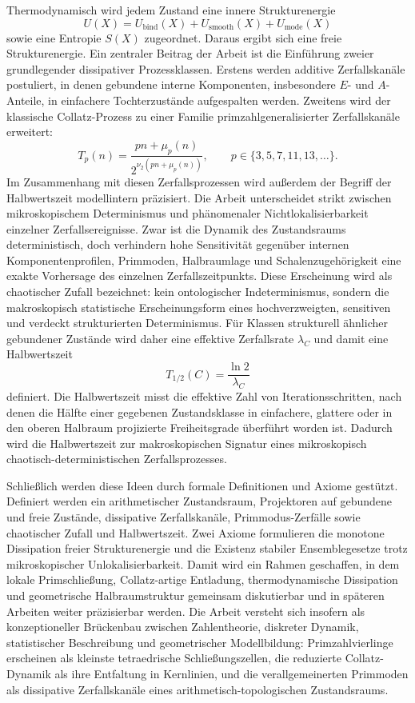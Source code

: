 \documentclass[11pt,a4paper]{article}
\theoremstyle{definition}
\begin{document}
	Thermodynamisch wird jedem Zustand eine innere Strukturenergie
	\[
	U(X)=U_{\mathrm{bind}}(X)+U_{\mathrm{smooth}}(X)+U_{\mathrm{mode}}(X)
	\]
	sowie eine Entropie \(S(X)\) zugeordnet. Daraus ergibt sich eine freie Strukturenergie. 	Ein zentraler Beitrag der Arbeit ist die Einführung zweier grundlegender dissipativer Prozessklassen. Erstens werden additive Zerfallskanäle postuliert, in denen gebundene interne Komponenten, insbesondere \(E\)- und \(A\)-Anteile, in einfachere Tochterzustände aufgespalten werden. Zweitens wird der klassische Collatz-Prozess zu einer Familie primzahlgeneralisierter Zerfallskanäle erweitert:
	\[
	T_p(n)=\frac{pn+\mu_p(n)}{2^{\nu_2(pn+\mu_p(n))}},
	\qquad
	p\in\{3,5,7,11,13,\dots\}.
	\] 	Im Zusammenhang mit diesen Zerfallsprozessen wird außerdem der Begriff der Halbwertszeit modellintern präzisiert. Die Arbeit unterscheidet strikt zwischen mikroskopischem Determinismus und phänomenaler Nichtlokalisierbarkeit einzelner Zerfallsereignisse. Zwar ist die Dynamik des Zustandsraums deterministisch, doch verhindern hohe Sensitivität gegenüber internen Komponentenprofilen, Primmoden, Halbraumlage und Schalenzugehörigkeit eine exakte Vorhersage des einzelnen Zerfallszeitpunkts. Diese Erscheinung wird als chaotischer Zufall bezeichnet: kein ontologischer Indeterminismus, sondern die makroskopisch statistische Erscheinungsform eines hochverzweigten, sensitiven und verdeckt strukturierten Determinismus. Für Klassen strukturell ähnlicher gebundener Zustände wird daher eine effektive Zerfallsrate \(\lambda_C\) und damit eine Halbwertszeit
	\[
	T_{1/2}(C)=\frac{\ln 2}{\lambda_C}
	\]
	definiert. Die Halbwertszeit misst die effektive Zahl von Iterationsschritten, nach denen die Hälfte einer gegebenen Zustandsklasse in einfachere, glattere oder in den oberen Halbraum projizierte Freiheitsgrade überführt worden ist. Dadurch wird die Halbwertszeit zur makroskopischen Signatur eines mikroskopisch chaotisch-deterministischen Zerfallsprozesses. 
	
	Schließlich werden diese Ideen durch formale Definitionen und Axiome gestützt. Definiert werden ein arithmetischer Zustandsraum, Projektoren auf gebundene und freie Zustände, dissipative Zerfallskanäle, Primmodus-Zerfälle sowie chaotischer Zufall und Halbwertszeit. Zwei Axiome formulieren die monotone Dissipation freier Strukturenergie und die Existenz stabiler Ensemblegesetze trotz mikroskopischer Unlokalisierbarkeit. Damit wird ein Rahmen geschaffen, in dem lokale Primschließung, Collatz-artige Entladung, thermodynamische Dissipation und geometrische Halbraumstruktur gemeinsam diskutierbar und in späteren Arbeiten weiter präzisierbar werden. Die Arbeit versteht sich insofern als konzeptioneller Brückenbau zwischen Zahlentheorie, diskreter Dynamik, statistischer Beschreibung und geometrischer Modellbildung: Primzahlvierlinge erscheinen als kleinste tetraedrische Schließungszellen, die reduzierte Collatz-Dynamik als ihre Entfaltung in Kernlinien, und die verallgemeinerten Primmoden als dissipative Zerfallskanäle eines arithmetisch-topologischen Zustandsraums. 
\end{document}
